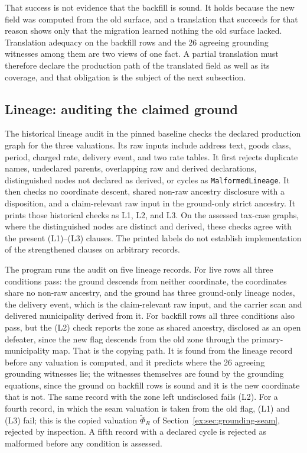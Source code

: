 \documentclass[11pt]{article}
\theoremstyle{definition}
\newcommand{\code}[1]{\texttt{#1}}
\begin{document}
That success is not evidence that the backfill is sound. It holds because the new field was computed from the old surface, and a translation that succeeds for that reason shows only that the migration learned nothing the old surface lacked. Translation adequacy on the backfill rows and the 26 agreeing grounding witnesses among them are two views of one fact. A partial translation must therefore declare the production path of the translated field as well as its coverage, and that obligation is the subject of the next subsection.

\subsection{Lineage: auditing the claimed ground}\label{ex:sec:case-audit}

The historical lineage audit in the pinned baseline checks the declared production graph for the three valuations. Its raw inputs include address text, goods class, period, charged rate, delivery event, and two rate tables. It first rejects duplicate names, undeclared parents, overlapping raw and derived declarations, distinguished nodes not declared as derived, or cycles as \code{MalformedLineage}. It then checks no coordinate descent, shared non-raw ancestry disclosure with a disposition, and a claim-relevant raw input in the ground-only strict ancestry. It prints those historical checks as L1, L2, and L3. On the assessed tax-case graphs, where the distinguished nodes are distinct and derived, these checks agree with the present (L1)--(L3) clauses. The printed labels do not establish implementation of the strengthened clauses on arbitrary records.

The program runs the audit on five lineage records. For live rows all three conditions pass: the ground descends from neither coordinate, the coordinates share no non-raw ancestry, and the ground has three ground-only lineage nodes, the delivery event, which is the claim-relevant raw input, and the carrier scan and delivered municipality derived from it. For backfill rows all three conditions also pass, but the (L2) check reports the zone as shared ancestry, disclosed as an open defeater, since the new flag descends from the old zone through the primary-municipality map. That is the copying path. It is found from the lineage record before any valuation is computed, and it predicts where the 26 agreeing grounding witnesses lie; the witnesses themselves are found by the grounding equations, since the ground on backfill rows is sound and it is the new coordinate that is not. The same record with the zone left undisclosed fails (L2). For a fourth record, in which the seam valuation is taken from the old flag, (L1) and (L3) fail; this is the copied valuation $\widetilde\Phi_R$ of Section~\ref{ex:sec:grounding-seam}, rejected by inspection. A fifth record with a declared cycle is rejected as malformed before any condition is assessed.
\end{document}
